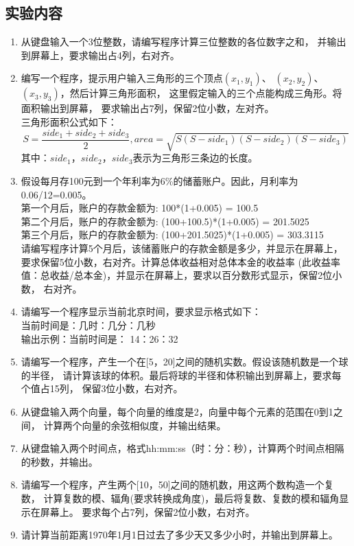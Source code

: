 \documentclass[a4paper]{ctexart}
\begin{document}
   \subsection{实验内容}
      \begin{enumerate}
         \item 从键盘输入一个3位整数，请编写程序计算三位整数的各位数字之和，%
            并输出到屏幕上，要求输出占4列，右对齐。
         \item 编写一个程序，提示用户输入三角形的三个顶点$(x_1,y_1)$、%
            $(x_2,y_2)$、$(x_3,y_3)$，然后计算三角形面积，%
            这里假定输入的三个点能构成三角形。将面积输出到屏幕，%
            要求输出占7列，保留2位小数，左对齐。\\
            三角形面积公式如下：
            $$S=\frac{side_1+side_2+side_3}{2}, area=\sqrt{S(S-side_1)(S-side_2)(S-side_3)}$$
            其中：$side_1$，$side_2$，$side_3$表示为三角形三条边的长度。
         \item 假设每月存100元到一个年利率为6\%的储蓄账户。因此，月利率为0.06/12=0.005。\\
            第一个月后，账户的存款金额为: 100*(1+0.005) = 100.5\\
            第二个月后，账户的存款金额为: (100+100.5)*(1+0.005) = 201.5025\\
            第三个月后，账户的存款金额为: (100+201.5025)*(1+0.005) = 303.3115\\
            请编写程序计算5个月后，该储蓄账户的存款金额是多少，并显示在屏幕上，%
            要求保留5位小数，右对齐。计算总体收益相对总体本金的收益率%
            (此收益率值：总收益/总本金)，并显示在屏幕上，要求以百分数形式显示，保留2位小数，%
            右对齐。
         \item 请编写一个程序显示当前北京时间，要求显示格式如下：\\
            当前时间是：几时：几分：几秒\\
            输出示例：当前时间是： 14：26：32
         \item 请编写一个程序，产生一个在[5，20]之间的随机实数。假设该随机数是一个球的半径，%
            请计算该球的体积。最后将球的半径和体积输出到屏幕上，要求每个值占15列，%
            保留3位小数，右对齐。
         \item 从键盘输入两个向量，每个向量的维度是2，向量中每个元素的范围在0到1之间，%
            计算两个向量的余弦相似度，并输出结果。
         \item 从键盘输入两个时间点，格式hh:mm:ss（时：分：秒），计算两个时间点相隔的秒数，并输出。
         \item 请编写一个程序，产生两个[10，50]之间的随机数，用这两个数构造一个复数，%
            计算复数的模、辐角(要求转换成角度)，最后将复数、复数的模和辐角显示在屏幕上。%
            要求每个占7列，保留2位小数，右对齐。
         \item 请计算当前距离1970年1月1日过去了多少天又多少小时，并输出到屏幕上。
      \end{enumerate}
\end{document}
